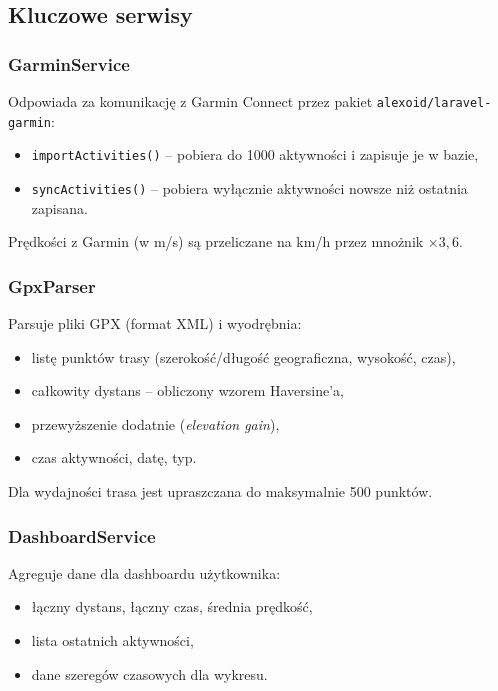 \documentclass[12pt,a4paper]{report}
\begin{document}
\subsection{Kluczowe serwisy}

\subsubsection{GarminService}

Odpowiada za komunikację z Garmin Connect przez pakiet \texttt{alexoid/laravel-garmin}:
\begin{itemize}[noitemsep]
    \item \texttt{importActivities()} -- pobiera do 1000 aktywności i zapisuje je w bazie,
    \item \texttt{syncActivities()} -- pobiera wyłącznie aktywności nowsze niż ostatnia zapisana.
\end{itemize}
Prędkości z Garmin (w m/s) są przeliczane na km/h przez mnożnik $\times 3{,}6$.

\subsubsection{GpxParser}

Parsuje pliki GPX (format XML) i wyodrębnia:
\begin{itemize}[noitemsep]
    \item listę punktów trasy (szerokość/długość geograficzna, wysokość, czas),
    \item całkowity dystans -- obliczony wzorem Haversine'a,
    \item przewyższenie dodatnie (\textit{elevation gain}),
    \item czas aktywności, datę, typ.
\end{itemize}
Dla wydajności trasa jest upraszczana do maksymalnie 500 punktów.

\subsubsection{DashboardService}

Agreguje dane dla dashboardu użytkownika:
\begin{itemize}[noitemsep]
    \item łączny dystans, łączny czas, średnia prędkość,
    \item lista ostatnich aktywności,
    \item dane szeregów czasowych dla wykresu.
\end{itemize}
\end{document}
